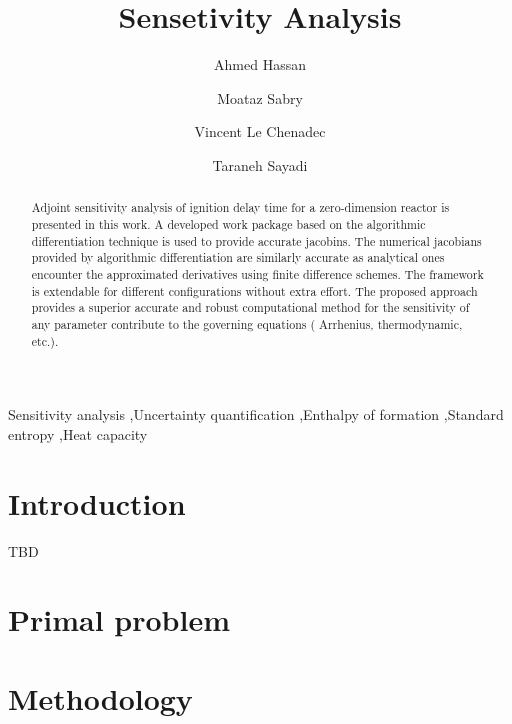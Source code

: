 \documentclass[preprint,review,12pt]{elsarticle}
\begin{document}
\begin{frontmatter}

\title{Sensetivity Analysis}

\author{Ahmed Hassan}
\author{Moataz Sabry}
\author{Vincent Le Chenadec}
\author{Taraneh Sayadi}



\address{Institute for Combustion Technology, RWTH Aachen University, 52064 Aachen, Germany}

\begin{abstract}

Adjoint sensitivity analysis of ignition delay time for a zero-dimension reactor is presented in this work. A developed work package based on the algorithmic differentiation technique is used to provide accurate jacobins. The numerical jacobians provided by algorithmic differentiation are similarly accurate as analytical ones encounter the approximated derivatives using finite difference schemes. The framework is extendable for different configurations without extra effort. The proposed approach provides a superior accurate and robust computational method for the sensitivity of any parameter contribute to the governing equations ( Arrhenius, thermodynamic, etc.).          

\end{abstract}

\begin{keyword}

Sensitivity analysis \sep Uncertainty quantification \sep Enthalpy of formation \sep Standard entropy \sep Heat capacity

\end{keyword}

\end{frontmatter}

\clearpage

\section{Introduction}
\label{Introduction}

TBD
\section{Primal problem}

\section{Methodology}
\label{Methodology}
\end{document}

